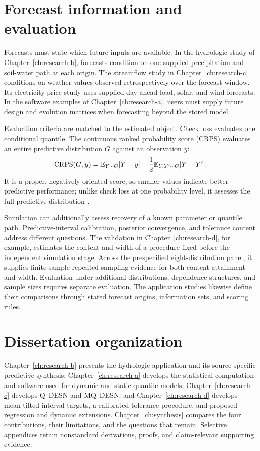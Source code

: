 \section{Forecast information and evaluation}
\label{sec:intro-evaluation}

Forecasts must state which future inputs are available. In the hydrologic study
of Chapter~\ref{ch:research-b}, forecasts condition on one supplied
precipitation and soil-water path at each origin. The streamflow study in
Chapter~\ref{ch:research-c} conditions on
weather values observed retrospectively over the forecast window. Its
electricity-price study uses supplied day-ahead load, solar, and wind forecasts.
In the software
examples of Chapter~\ref{ch:research-a}, users must supply future design and
evolution matrices when forecasting beyond the stored model.

Evaluation criteria are matched to the estimated object. Check loss evaluates
one conditional quantile. The continuous ranked probability score (CRPS)
evaluates an entire predictive distribution \(G\) against an observation
\(y\):
\begin{equation}
\operatorname{CRPS}(G,y)
=
\mathbb{E}_{Y\sim G}|Y-y|
-\frac12\mathbb{E}_{Y,Y'\sim G}|Y-Y'|.
\label{eq:intro-crps}
\end{equation}
It is a proper, negatively oriented score, so smaller values indicate better
predictive performance; unlike check loss at one probability level, it assesses
the full predictive distribution \citep{exd-gneiting2007}.

Simulation can additionally assess recovery of a known parameter or quantile
path. Predictive-interval calibration, posterior convergence, and tolerance
content address different questions. The validation in
Chapter~\ref{ch:research-d}, for example, estimates the content and width of a procedure fixed
before the independent simulation stage. Across the prespecified
eight-distribution panel, it supplies finite-sample repeated-sampling evidence
for both content attainment and width. Evaluation under additional
distributions, dependence structures, and sample sizes requires separate
evaluation.
The application studies likewise define their comparisons through stated
forecast origins, information sets, and scoring rules.

\section{Dissertation organization}
\label{sec:intro-organization}

Chapter~\ref{ch:research-b} presents the hydrologic application and its
source-specific predictive synthesis; Chapter~\ref{ch:research-a} develops the
statistical computation and software used for dynamic and static quantile
models; Chapter~\ref{ch:research-c} develops Q--DESN and MQ--DESN; and
Chapter~\ref{ch:research-d} develops mean-tilted interval targets, a calibrated
tolerance procedure, and proposed regression and dynamic extensions.
Chapter~\ref{ch:synthesis} compares the four contributions, their limitations,
and the questions that remain. Selective appendices retain nonstandard
derivations, proofs, and claim-relevant supporting evidence.
